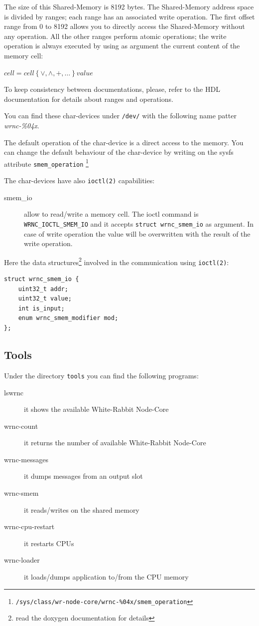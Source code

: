 \documentclass[a4paper,10pt]{article}
\begin{document}
The size of this Shared-Memory is 8192 bytes. The Shared-Memory
address space is divided by ranges; each range has an associated write
operation. The first offset range from 0 to 8192 allows you to
directly access the Shared-Memory without any operation. All the other
ranges perform atomic operations; the write operation is always
executed by using as argument the current content of the memory cell:

\begin{math}
  cell = cell \left\{ \vee, \wedge, +, \dots \right\} value
\end{math}

To keep consistency between documentations, please, refer to the HDL 
documentation for details about ranges and operations.

You can find these char-devices under \texttt{/dev/} with the
following name patter \textit{wrnc-\%04x}.

The default operation of the char-device is a direct access to the 
memory. You can change the default behaviour of the char-device by 
writing on the sysfs attribute \texttt{smem\_operation}
\footnote{\texttt{/sys/class/wr-node-core/wrnc-\%04x/smem\_operation}}
 

The char-devices have also \texttt{ioctl(2)} capabilities:
\begin{description}
  \item[smem\_io] allow to read/write a memory cell. The ioctl command
    is \texttt{WRNC\_IOCTL\_SMEM\_IO} and it accepts \texttt{struct
    wrnc\_smem\_io} as argument. In case of write operation the
    value will be overwritten with the result of the write operation.
\end{description}

Here the data structures\footnote{read the doxygen documentation for 
details} involved in the communication using
\texttt{ioctl(2)}:

\begin{lstlisting}
struct wrnc_smem_io {
	uint32_t addr;
	uint32_t value;
	int is_input;
	enum wrnc_smem_modifier mod;
};
\end{lstlisting}


\subsection{Tools}%
Under the directory \texttt{tools} you can find the following
programs:

\begin{description}
  \item[lswrnc] it shows the available White-Rabbit Node-Core
  \item[wrnc-count] it returns the number of available White-Rabbit
    Node-Core
  \item[wrnc-messages] it dumps messages from an output slot
  \item[wrnc-smem] it reads/writes on the shared memory
  \item[wrnc-cpu-restart] it restarts CPUs
  \item[wrnc-loader] it loads/dumps application to/from the CPU memory
\end{description}
\end{document}
